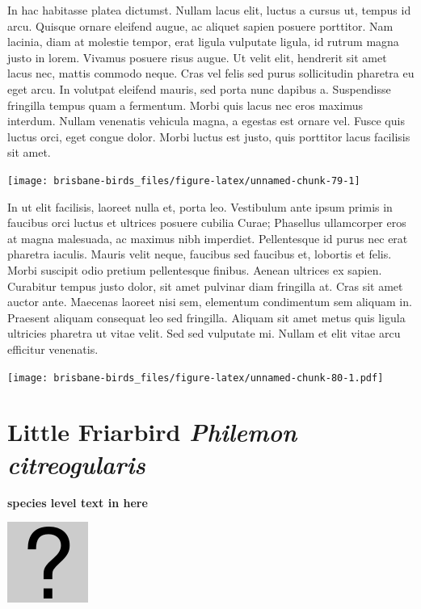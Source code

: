 \documentclass[]{book}
\let\origfigure\figure
\let\endorigfigure\endfigure
\renewenvironment{figure}[1][2] {
  \expandafter\origfigure\expandafter[H]
} {
  \endorigfigure
}
\begin{document}
In hac habitasse platea dictumst. Nullam lacus elit, luctus a cursus ut,
tempus id arcu. Quisque ornare eleifend augue, ac aliquet sapien posuere
porttitor. Nam lacinia, diam at molestie tempor, erat ligula vulputate
ligula, id rutrum magna justo in lorem. Vivamus posuere risus augue. Ut
velit elit, hendrerit sit amet lacus nec, mattis commodo neque. Cras vel
felis sed purus sollicitudin pharetra eu eget arcu. In volutpat eleifend
mauris, sed porta nunc dapibus a. Suspendisse fringilla tempus quam a
fermentum. Morbi quis lacus nec eros maximus interdum. Nullam venenatis
vehicula magna, a egestas est ornare vel. Fusce quis luctus orci, eget
congue dolor. Morbi luctus est justo, quis porttitor lacus facilisis sit
amet.

\begin{figure}
\texttt{[image: brisbane-birds\_files/figure-latex/unnamed-chunk-79-1]} \caption{insert figure caption}\label{fig:unnamed-chunk-79}
\end{figure}

In ut elit facilisis, laoreet nulla et, porta leo. Vestibulum ante ipsum
primis in faucibus orci luctus et ultrices posuere cubilia Curae;
Phasellus ullamcorper eros at magna malesuada, ac maximus nibh
imperdiet. Pellentesque id purus nec erat pharetra iaculis. Mauris velit
neque, faucibus sed faucibus et, lobortis et felis. Morbi suscipit odio
pretium pellentesque finibus. Aenean ultrices ex sapien. Curabitur
tempus justo dolor, sit amet pulvinar diam fringilla at. Cras sit amet
auctor ante. Maecenas laoreet nisi sem, elementum condimentum sem
aliquam in. Praesent aliquam consequat leo sed fringilla. Aliquam sit
amet metus quis ligula ultricies pharetra ut vitae velit. Sed sed
vulputate mi. Nullam et elit vitae arcu efficitur venenatis.

\begin{figure}
\centering
\texttt{[image: brisbane-birds\_files/figure-latex/unnamed-chunk-80-1.pdf]}
\caption{\label{fig:unnamed-chunk-80}insert figure caption}
\end{figure}

\section{\texorpdfstring{Little Friarbird \emph{Philemon
citreogularis}}{Little Friarbird Philemon citreogularis}}\label{little-friarbird-philemon-citreogularis}

\textbf{species level text in here}

\begin{figure}
\centering
\includegraphics{assets/missing.png}
\caption{No image for species}
\end{figure}
\end{document}

